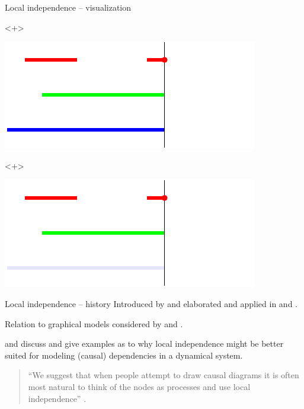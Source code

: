 \documentclass{beamer}\usepackage{listings}
\begin{document}
\begin{frame}[label={sec:org328bd26}]{Local independence -- visualization}
\begin{onlyenv}<+>
\begin{center}
\includegraphics[width=.9\linewidth]{./figs/local-ind1.pdf}
\end{center}
\end{onlyenv}

\begin{onlyenv}<+>
\begin{center}
\includegraphics[width=.9\linewidth]{./figs/local-ind2.pdf}
\end{center}
\end{onlyenv}
\end{frame}

\begin{frame}[label={sec:orge546ce9}]{Local independence -- history}
Introduced by \cite{schweder1970composable} and elaborated and applied in \cite{aalen1987dynamic}
and \cite{aalen1980interaction}. \vfill \pause

Relation to graphical models considered by \cite{didelez2008graphical} and
\cite{mogensen2020markov}. \vfill \pause

\cite{aalen2016can} and \cite{aalen2012causality} discuss and give examples as to why local
independence might be better suited for modeling (causal) dependencies in a dynamical system. \vfill
\pause

\begin{quote} %
``We suggest that when people attempt to draw causal diagrams it is often most natural to think of
the nodes as processes and use local independence'' \citep[p.2300]{aalen2016can}.
\end{quote}
\end{frame}
\end{document}
